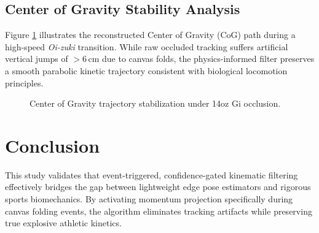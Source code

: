 \subsection{Center of Gravity Stability Analysis}
Figure \ref{fig:cog_trajectory} illustrates the reconstructed Center of Gravity ($\text{CoG}$) path during a high-speed \textit{Oi-zuki} transition. While raw occluded tracking suffers artificial vertical jumps of $>6\,\text{cm}$ due to canvas folds, the physics-informed filter preserves a smooth parabolic kinetic trajectory consistent with biological locomotion principles.

\begin{figure}[h]
    \centering
    \caption{Center of Gravity trajectory stabilization under 14oz Gi occlusion.}
    \label{fig:cog_trajectory}
\end{figure}

\section{Conclusion}
This study validates that event-triggered, confidence-gated kinematic filtering effectively bridges the gap between lightweight edge pose estimators and rigorous sports biomechanics. By activating momentum projection specifically during canvas folding events, the algorithm eliminates tracking artifacts while preserving true explosive athletic kinetics.
